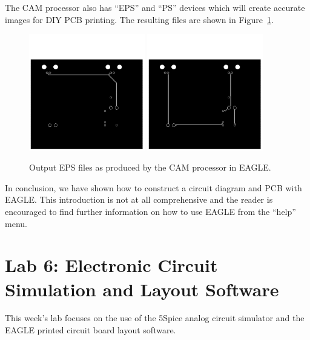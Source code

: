 \documentclass{article}
\begin{document}
The CAM processor also has ``EPS'' and ``PS'' devices which will create accurate images for DIY PCB printing.  The resulting files are shown in Figure~\ref{fig:eagle:board_eps}.  

\begin{figure}
\begin{center}
\includegraphics[width=0.45\textwidth]{pics/band_pass_bottom} \includegraphics[width=0.45\textwidth]{pics/band_pass_top}
\end{center}
\caption{Output EPS files as produced by the CAM processor in EAGLE.}
\label{fig:eagle:board_eps}
\end{figure}

In conclusion, we have shown how to construct a circuit diagram and PCB with EAGLE. This introduction is not at all comprehensive and the reader is encouraged to find further information on how to use EAGLE from the ``help'' menu.

\pagebreak

\section{Lab 6: Electronic Circuit Simulation and Layout Software}
This week's lab focuses on the use of the 5Spice analog circuit simulator and the EAGLE printed circuit board layout software.
\end{document}
